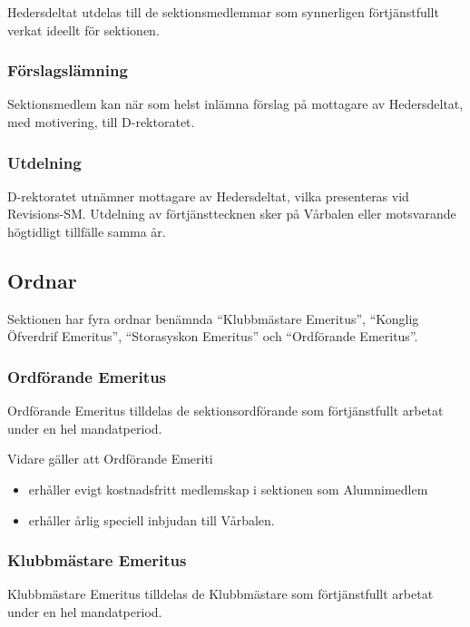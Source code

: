 \documentclass{dgovdoc}
\begin{document}
Hedersdeltat utdelas till de sektionsmedlemmar som synnerligen förtjänstfullt verkat ideellt för sektionen.

\subsubsection{Förslagslämning}

Sektionsmedlem kan när som helst inlämna förslag på mottagare av Hedersdeltat, med motivering, till D-rektoratet.

\subsubsection{Utdelning}

D-rektoratet utnämner mottagare av Hedersdeltat, vilka presenteras vid Revisions-SM. Utdelning av förtjänsttecknen sker på Vårbalen eller motsvarande högtidligt tillfälle samma år.

\subsection{Ordnar}

Sektionen har fyra ordnar benämnda ``Klubbmästare Emeritus'',
``Konglig Öfverdrif Emeritus'', ``Storasyskon Emeritus'' och ``Ordförande Emeritus''.

\subsubsection{Ordförande Emeritus}

Ordförande Emeritus tilldelas de sektionsordförande som förtjänstfullt arbetat under en hel mandatperiod.

Vidare gäller att Ordförande Emeriti

\begin{itemize}
  \item erhåller evigt kostnadsfritt medlemskap i sektionen som Alumnimedlem
  \item erhåller årlig speciell inbjudan till Vårbalen.
\end{itemize}

\subsubsection{Klubbmästare Emeritus}

Klubbmästare Emeritus tilldelas de Klubbmästare som förtjänstfullt arbetat under en hel mandatperiod.
\end{document}
